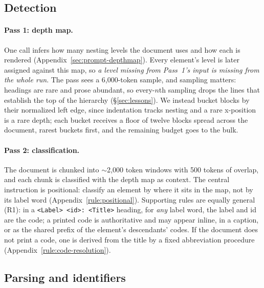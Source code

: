 \documentclass[letterpaper]{article} %
\begin{document}
\subsection{Detection}
\label{sec:method-detection}

\paragraph{Pass 1: depth map.} One call infers how many nesting levels the
document uses and how each is rendered (Appendix~\ref{sec:prompt-depthmap}).
Every element's level is later assigned against this map, so \emph{a level
missing from Pass~1's input is missing from the whole run}. The pass sees a
6{,}000-token sample, and sampling matters: headings are rare and prose
abundant, so every-$n$th sampling drops the lines that establish the top of
the hierarchy (\S\ref{sec:lessons}). We instead bucket blocks by their
normalized left edge, since indentation tracks nesting and a rare x-position is
a rare depth; each bucket receives a floor of twelve blocks spread across the
document, rarest buckets first, and the remaining budget goes to the bulk.

\paragraph{Pass 2: classification.} The document is chunked into
${\sim}$2{,}000 token windows with 500 tokens of overlap, and each chunk is
classified with the depth map as context. The central instruction is
positional: classify an element by where it sits in the map, not by its label
word (Appendix~\ref{rule:positional}). Supporting rules are equally general
(R1): in a \texttt{<Label> <id>: <Title>} heading, for \emph{any} label word,
the label and id are the code; a printed code is authoritative and may appear
inline, in a caption, or as the shared prefix of the element's descendants'
codes. If the document does not print a code, one is derived from the title by
a fixed abbreviation procedure (Appendix~\ref{rule:code-resolution}).

\subsection{Parsing and identifiers}
\label{sec:method-parsing}


\end{document}
